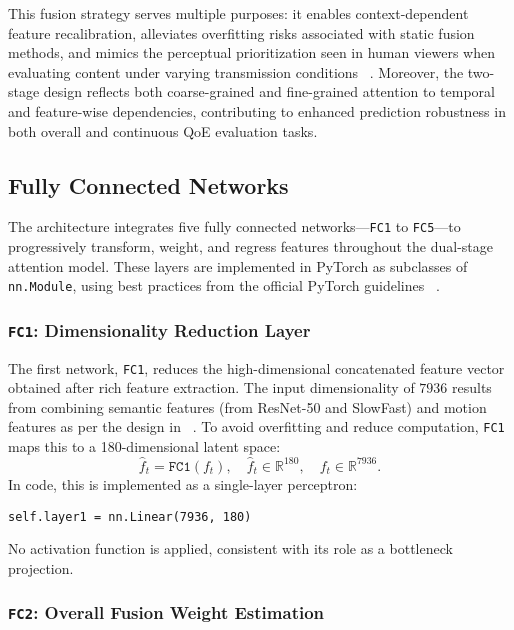 This fusion strategy serves multiple purposes: it enables context-dependent feature recalibration, alleviates overfitting risks associated with static fusion methods, and mimics the perceptual prioritization seen in human viewers when evaluating content under varying transmission conditions ~\cite{jia2024continuous}. Moreover, the two-stage design reflects both coarse-grained and fine-grained attention to temporal and feature-wise dependencies, contributing to enhanced prediction robustness in both overall and continuous QoE evaluation tasks.

\subsection{Fully Connected Networks}

The architecture integrates five fully connected networks—\texttt{FC1} to \texttt{FC5}—to progressively transform, weight, and regress features throughout the dual-stage attention model. These layers are implemented in PyTorch as subclasses of \texttt{nn.Module}, using best practices from the official PyTorch guidelines ~\cite{pytorch_tutorials}.

\subsubsection*{\texttt{FC1}: Dimensionality Reduction Layer}

The first network, \texttt{FC1}, reduces the high-dimensional concatenated feature vector obtained after rich feature extraction. The input dimensionality of $7936$ results from combining semantic features (from ResNet-50 and SlowFast) and motion features as per the design in ~\cite{jia2024continuous}. To avoid overfitting and reduce computation, \texttt{FC1} maps this to a 180-dimensional latent space:
\begin{equation}
    \hat{f}_t = \texttt{FC1}(f_t), \quad \hat{f}_t \in \mathbb{R}^{180}, \quad f_t \in \mathbb{R}^{7936}.
\end{equation}
In code, this is implemented as a single-layer perceptron:
\begin{verbatim}
self.layer1 = nn.Linear(7936, 180)
\end{verbatim}
No activation function is applied, consistent with its role as a bottleneck projection.

\subsubsection*{\texttt{FC2}: Overall Fusion Weight Estimation}

